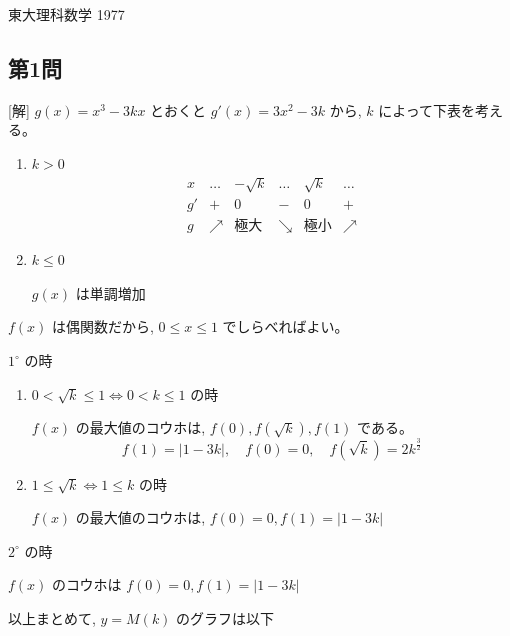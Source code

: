 \documentclass[../main.tex]{subfiles}
\begin{document}
\begin{center}
  {\Large 東大理科数学 1977}
\end{center}

\newpage

\subsection*{第1問}

[解] $g(x) = x^3 - 3kx$ とおくと $g'(x) = 3x^2 - 3k$ から, $k$ によって下表を考える。

\begin{enumerate}
  \item[$1^\circ$] $k > 0$
    \[
      \begin{array}{c|c|c|c|c|c}
        x & \dots & -\sqrt{k} & \dots & \sqrt{k} & \dots \\ \hline
        g' & + & 0 & - & 0 & + \\ \hline
        g & \nearrow & \text{極大} & \searrow & \text{極小} & \nearrow
      \end{array}
    \]
  \item[$2^\circ$] $k \le 0$

    $g(x)$ は単調増加
\end{enumerate}

$f(x)$ は偶関数だから, $0 \le x \le 1$ でしらべればよい。

$1^\circ$ の時
\begin{enumerate}
  \item[(i)] $0 < \sqrt{k} \le 1 \iff 0 < k \le 1$ の時

    $f(x)$ の最大値のコウホは, $f(0), f(\sqrt{k}), f(1)$ である。
    \[
      f(1) = |1-3k|, \quad f(0) = 0, \quad f(\sqrt{k}) = 2k^{\frac{3}{2}}
    \]

  \item[(ii)] $1 \le \sqrt{k} \iff 1 \le k$ の時

    $f(x)$ の最大値のコウホは, $f(0) = 0, f(1) = |1-3k|$
\end{enumerate}

$2^\circ$ の時

$f(x)$ のコウホは $f(0) = 0, f(1) = |1-3k|$

以上まとめて, $y = M(k)$ のグラフは以下
\end{document}
